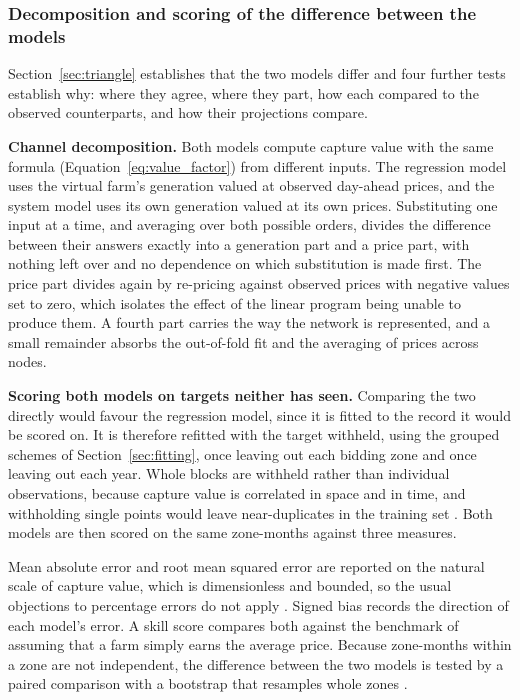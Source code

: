 \subsubsection{Decomposition and scoring of the difference between the models}
\label{sec:gap_method}

Section~\ref{sec:triangle} establishes that the two models differ and four further
tests establish why: where they agree, where they part, how each compared
to the observed counterparts, and how their projections compare.

\textbf{Channel decomposition.} Both models compute capture value with the same
formula (Equation~\ref{eq:value_factor}) from different inputs. The regression
model uses the virtual farm's generation valued at observed day-ahead prices,
and the system model uses its own generation valued at its own prices.
Substituting one input at a time, and averaging over both possible orders,
divides the difference between their answers exactly into a generation part and
a price part, with nothing left over and no dependence on which substitution is
made first. The price part divides again by re-pricing against observed prices
with negative values set to zero, which isolates the effect of the linear
program being unable to produce them. A fourth part carries the way the network
is represented, and a small remainder absorbs the out-of-fold fit and the
averaging of prices across nodes.

\textbf{Scoring both models on targets neither has seen.} Comparing the two
directly would favour the regression model, since it is fitted to the record it
would be scored on. It is therefore refitted with the target withheld, using the
grouped schemes of Section~\ref{sec:fitting}, once leaving out each bidding zone
and once leaving out each year. Whole blocks are withheld rather than individual
observations, because capture value is correlated in space and in time, and
withholding single points would leave near-duplicates in the training set
\cite{Roberts2017}. Both models are then scored on the same zone-months against three measures.

Mean absolute error and root mean squared error are
reported on the natural scale of capture value, which is dimensionless and
bounded, so the usual objections to percentage errors do not apply
\cite{HyndmanKoehler2006}. Signed bias records the direction of each model's
error. A skill score compares both against the benchmark of assuming that a farm
simply earns the average price. Because zone-months within a zone are not
independent, the difference between the two models is tested by a paired
comparison with a bootstrap that resamples whole zones \cite{DieboldMariano1995}.

